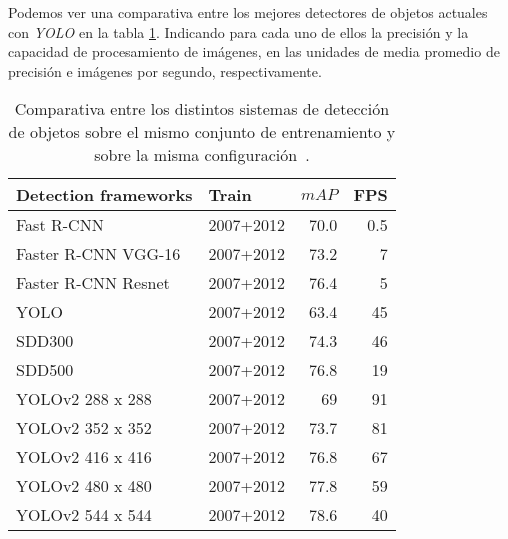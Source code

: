 Podemos ver una comparativa entre los mejores detectores de objetos actuales con \textit{YOLO} en la tabla \ref{tabla:comparativa_yolo}. Indicando para cada uno de ellos la precisión y la capacidad de procesamiento de imágenes, en las unidades de media promedio de precisión e imágenes por segundo, respectivamente.

\begin{table}
  \begin{center}
  \caption[Comparativa entre los distintos sistemas de detección de objetos]{Comparativa entre los distintos sistemas de detección de objetos sobre el mismo conjunto de entrenamiento y sobre la misma configuración~\cite{yolov2}.}
    \label{tabla:comparativa_yolo}
    \begin{tabular}{@{} l l r r@{}}
      \toprule
        \textbf{Detection frameworks}  & \textbf{Train} & \textbf{$mAP$} & \textbf{FPS} \\
      \midrule
        Fast R-CNN                     & 2007+2012      & 70.0           & 0.5 \\
        Faster R-CNN VGG-16                            & 2007+2012      & 73.2           & 7 \\
      Faster R-CNN Resnet                            & 2007+2012      & 76.4           & 5 \\
      YOLO                            & 2007+2012      & 63.4          & 45 \\
      SDD300                            & 2007+2012      & 74.3           & 46 \\
      SDD500                            & 2007+2012      & 76.8           & 19 \\\hline
      YOLOv2 288 x 288                            & 2007+2012      & 69           & 91 \\
      YOLOv2 352 x 352                            & 2007+2012      & 73.7           & 81 \\
      YOLOv2 416 x 416                            & 2007+2012      & 76.8           & 67 \\
      YOLOv2 480 x 480                            & 2007+2012      & 77.8           & 59 \\
      YOLOv2 544 x 544                            & 2007+2012      & 78.6           & 40 \\
      \bottomrule
    \end{tabular}
  \end{center}
\end{table}


